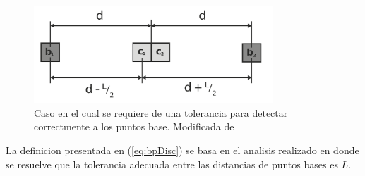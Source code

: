 \begin{figure}[H]
  \centerfloat

  \includegraphics[clip=true, width=0.80\textwidth]{imagenes/basis/horizontalMod.png}

  \caption[Caso en el cual se requiere de una tolerancia para detectar correctmente a los puntos base.]{Caso en el cual se requiere de una tolerancia para detectar correctmente a los puntos base. Modificada de \cite{Liu2015}}\label{fig:bptol}

\end{figure}

La definicion presentada en (\ref{eq:bpDisc}) se basa en el analisis realizado
en \cite{Liu2015} donde se resuelve que la tolerancia adecuada entre las
distancias de puntos bases es $L$.



